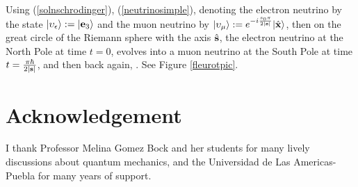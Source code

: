 \documentclass[]{article}
\begin{document}
Using (\ref{solnschrodinger}),  (\ref{neutrinosimple}), denoting the electron neutrino by the state $|\upsilon_\epsilon\rangle :=|\mathbf{e}_3\rangle$ 
 and the muon neutrino by $|\upsilon_\mu\rangle:=e^{-i\frac{s_0\pi }{2|\mathbf{s}|}} | \hat {\mathbf{x}} \rangle$, then on the great circle of the Riemann sphere with the axis $ \hat {\mathbf{s}}$,
  the electron neutrino at the North Pole at time $t=0$, evolves into a muon neutrino at the South Pole at time $t=\frac{\pi \hbar}{2|\mathbf{s}|}$,
 and then back again, \cite{wiki1,neutrino,neutrino1}. See Figure \ref{fleurotpic}.
  
\section*{Acknowledgement}
I thank Professor Melina Gomez Bock and her students for many lively discussions about quantum mechanics, and
the Universidad de Las Americas-Puebla for many years of support.
      
\end{document}
